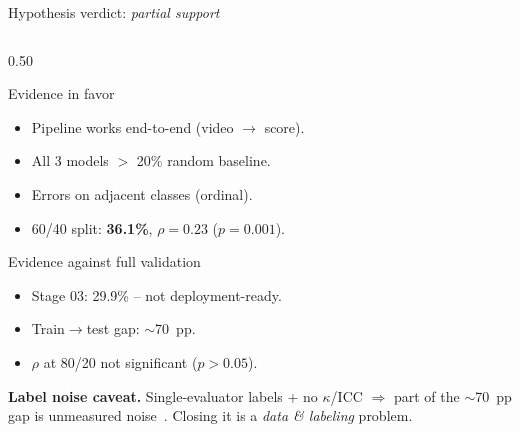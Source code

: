 \begin{frame}{Hypothesis verdict: \emph{partial support}}
\hypertarget{sub:verdict}{}%
\begin{columns}[T,onlytextwidth]

\begin{column}{0.50\textwidth}
\begin{exampleblock}{Evidence in favor}
\scriptsize
\begin{itemize}\itemsep1pt
    \item Pipeline works end-to-end (video $\rightarrow$ score).
    \item All 3 models \alert{$>$ 20\% random baseline}.
    \item Errors on \alert{adjacent classes} (ordinal).
    \item 60/40 split: \textbf{36.1\%}, $\rho\!=\!0.23$ ($p\!=\!0.001$).
\end{itemize}
\end{exampleblock}

\begin{alertblock}{Evidence against full validation}
\scriptsize
\begin{itemize}\itemsep1pt
    \item Stage 03: 29.9\% -- not deployment-ready.
    \item Train$\to$test gap: $\sim$70~pp.
    \item $\rho$ at 80/20 not significant ($p\!>\!0.05$).
\end{itemize}
\end{alertblock}

\begin{infoBox}\tiny
\textbf{\color{tecdark}Label noise caveat.} Single-evaluator labels + no $\kappa$/ICC $\Rightarrow$ part of the $\sim$70~pp gap is unmeasured noise~\cite{Frenay2014LabelNoise}. Closing it is a \emph{data \& labeling} problem.
\end{infoBox}
\end{column}


\end{columns}
\end{frame}
